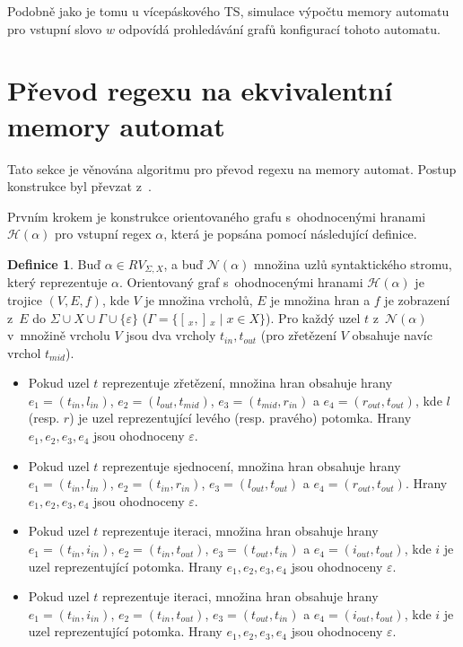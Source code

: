 \documentclass[thesis=B,czech]{FITthesis}[2019/12/23]
\theoremstyle{definition}
\newtheorem{definition}{Definice}[chapter]
\begin{document}
Podobně jako je tomu u vícepáskového TS, simulace výpočtu memory automatu pro vstupní slovo $w$ odpovídá prohledávání grafů konfigurací tohoto automatu. 

\section{Převod regexu na ekvivalentní memory automat}\label{section:simplemem}
Tato sekce je věnována algoritmu pro převod regexu na memory automat. Postup konstrukce byl převzat z~\cite[sekce 2.3]{schmidref}.

Prvním krokem je konstrukce orientovaného grafu s~ohodnocenými hranami $\mathcal{H}(\alpha)$ pro vstupní regex $\alpha$, která je popsána pomocí následující definice.     

\begin{definition}Buď $\alpha \in RV_{\Sigma, X}$, a buď $\mathcal{N}(\alpha)$ množina uzlů syntaktického stromu, který reprezentuje $\alpha$.
Orientovaný graf s~ohodnocenými hranami $\mathcal{H}(\alpha)$ je trojice $(V, E, f)$, kde $V$ je množina vrcholů, $E$ je množina hran a $f$ je zobrazení z~$E$ do $\Sigma\cup X \cup \Gamma \cup \{\varepsilon\}$ ($\Gamma = \{ [\,_x, ]\,_x \mid x \in X \}$). Pro každý uzel $t$ z~$\mathcal{N}(\alpha)$ v~množině vrcholu $V$ jsou dva vrcholy $t_{in}, t_{out}$ (pro zřetězení $V$ obsahuje navíc vrchol $t_{mid}$). 
	\begin{itemize}
		\item{Pokud uzel $t$ reprezentuje zřetězení, množina hran obsahuje hrany $e_1 = (t_{in}, l_{in})$, $e_2=(l_{out}, t_{mid})$, $e_3=(t_{mid}, r_{in})$ a $e_4=(r_{out}, t_{out})$, kde $l$ (resp. $r$) je uzel reprezentující levého (resp. pravého) potomka. Hrany $e_1, e_2, e_3, e_4$ jsou ohodnoceny $\varepsilon$.}
		\item{Pokud uzel $t$ reprezentuje sjednocení, množina hran obsahuje hrany $e_1 = (t_{in}, l_{in})$, $e_2=(t_{in}, r_{in})$, $e_3=(l_{out}, t_{out})$ a $e_4=(r_{out}, t_{out})$. Hrany $e_1, e_2, e_3, e_4$ jsou ohodnoceny $\varepsilon$.}
		\item{Pokud uzel $t$ reprezentuje iteraci, množina hran obsahuje hrany $e_1 = (t_{in}, i_{in})$, $e_2=(t_{in}, t_{out})$, $e_3=(t_{out}, t_{in})$ a $e_4=(i_{out}, t_{out})$, kde $i$ je uzel reprezentující potomka. Hrany $e_1, e_2, e_3, e_4$ jsou ohodnoceny $\varepsilon$.}
		\item{Pokud uzel $t$ reprezentuje iteraci, množina hran obsahuje hrany $e_1 = (t_{in}, i_{in})$, $e_2=(t_{in}, t_{out})$, $e_3=(t_{out}, t_{in})$ a $e_4=(i_{out}, t_{out})$, kde $i$ je uzel reprezentující potomka. Hrany $e_1, e_2, e_3, e_4$ jsou ohodnoceny $\varepsilon$.}

\end{itemize}
\end{definition}
\end{document}
